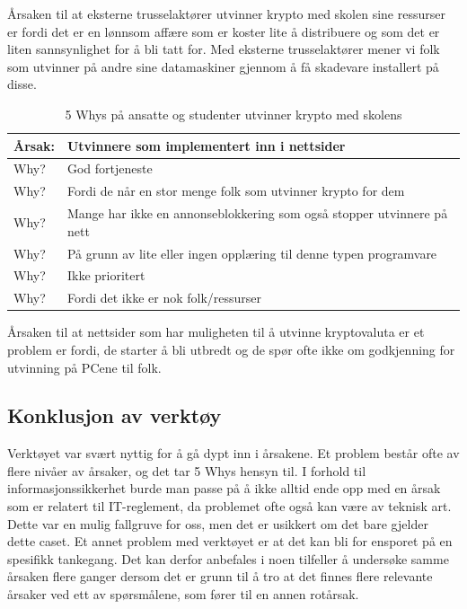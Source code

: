 Årsaken til at eksterne trusselaktører utvinner krypto med skolen sine ressurser er fordi det er en lønnsom affære som er koster lite å distribuere og som det er liten sannsynlighet for å bli tatt for. Med eksterne trusselaktører mener vi folk som utvinner på andre sine datamaskiner gjennom å få skadevare installert på disse.

\begin{table} [H]
    \centering
    \begin{tabular}{ | m{5em} | m{30em} | }
        \hline
            \cellcolor{yellow} Årsak: & \cellcolor{yellow} Utvinnere som implementert inn i nettsider              \\
        \hline
            Why? & God fortjeneste                                   \\
        \hline
            Why? & Fordi de når en stor menge folk som utvinner krypto for dem                                           \\
        \hline
            Why? & Mange har ikke en annonseblokkering som også stopper utvinnere på nett               \\
        \hline
            Why? & På grunn av lite eller ingen opplæring til denne typen programvare           \\
        \hline
            Why? & Ikke prioritert    \\
        \hline
            Why? & Fordi det ikke er nok folk/ressurser    \\
        \hline
    \end{tabular}
    \caption[5 Whys: Minere som er implementert inn i nettsider]{5 Whys på ansatte og studenter utvinner krypto med skolens}
    \label{5Whys-minere}
\end{table}
Årsaken til at nettsider som har muligheten til å utvinne kryptovaluta er et problem er fordi, de starter å bli utbredt og de spør ofte ikke om godkjenning for utvinning på PCene til folk.

\subsection{Konklusjon av verktøy}
Verktøyet var svært nyttig for å gå dypt inn i årsakene. Et problem består ofte av flere nivåer av årsaker, og det tar 5 Whys hensyn til. I forhold til informasjonssikkerhet burde man passe på å ikke alltid ende opp med en årsak som er relatert til IT-reglement, da problemet ofte også kan være av teknisk art. Dette var en mulig fallgruve for oss, men det er usikkert om det bare gjelder dette caset. Et annet problem med verktøyet er at det kan bli for ensporet på en spesifikk tankegang. Det kan derfor anbefales i noen tilfeller å undersøke samme årsaken flere ganger dersom det er grunn til å tro at det finnes flere relevante 
årsaker ved ett av spørsmålene, som fører til en annen rotårsak.

